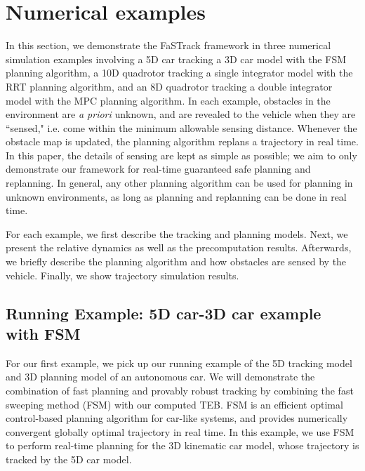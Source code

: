 \section{Numerical examples} \label{sec:results}

In this section, we demonstrate the FaSTrack framework in three numerical simulation examples involving a 5D car tracking a 3D car model with the FSM planning algorithm, a 10D quadrotor tracking a single integrator model with the RRT planning algorithm, and an 8D quadrotor tracking a double integrator model with the MPC planning algorithm.
In each example, obstacles in the environment are \textit{a priori} unknown, and are revealed to the vehicle when they are ``sensed," i.e. come within the minimum allowable sensing distance.
Whenever the obstacle map is updated, the planning algorithm replans a trajectory in real time.
In this paper, the details of sensing are kept as simple as possible; we aim to only demonstrate our framework for real-time guaranteed safe planning and replanning.
In general, any other planning algorithm can be used for planning in unknown environments, as long as planning and replanning can be done in real time.

For each example, we first describe the tracking and planning models. 
Next, we present the relative dynamics as well as the precomputation results. 
Afterwards, we briefly describe the planning algorithm and how obstacles are sensed by the vehicle. 
Finally, we show trajectory simulation results.

\subsection{\textbf{Running Example:} 5D car-3D car example with FSM \label{sec:reach_planner}}

For our first example, we pick up our running example of the 5D tracking model and 3D planning model of an autonomous car. We will demonstrate the combination of fast planning and provably robust tracking by combining the fast sweeping method (FSM) \cite{Takei2013} with our computed TEB. 
FSM is an efficient optimal control-based planning algorithm for car-like systems, and provides numerically convergent globally optimal trajectory in real time.
In this example, we use FSM to perform real-time planning for the 3D kinematic car model, whose trajectory is tracked by the 5D car model.

